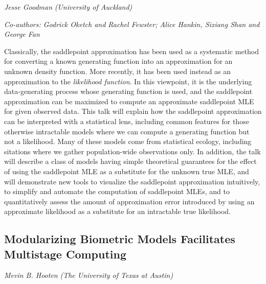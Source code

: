 \documentclass[
]{scrreprt}
\begin{document}
\emph{Jesse Goodman} \emph{(University of
Auckland)}

\emph{Co-authors: Godrick Oketch and Rachel Fewster; Alice Hankin,
Sixiang Shan and George Fan}

\setlength{\parskip}{0.5em}

Classically, the saddlepoint approximation has been used as a systematic
method for converting a known generating function into an approximation
for an unknown density function. More recently, it has been used instead
as an approximation to the \emph{likelihood function}. In this
viewpoint, it is the underlying data-generating process whose generating
function is used, and the saddlepoint approximation can be maximized to
compute an approximate saddlepoint MLE for given observed data. This
talk will explain how the saddlepoint approximation can be interpreted
with a statistical lens, including common features for those otherwise
intractable models where we can compute a generating function but not a
likelihood. Many of these models come from statistical ecology,
including sitations where we gather population-wide observations only.
In addition, the talk will describe a class of models having simple
theoretical guarantees for the effect of using the saddlepoint MLE as a
substitute for the unknown true MLE, and will demonstrate new tools to
visualize the saddlepoint approximation intuitively, to simplify and
automate the computation of saddlepoint MLEs, and to quantitatively
assess the amount of approximation error introduced by using an
approximate likelihood as a substitute for an intractable true
likelihood.

\subsection{Modularizing Biometric Models Facilitates Multistage
Computing}\label{modularizing-biometric-models-facilitates-multistage-computing}

\emph{Mevin B. Hooten} \emph{(The University of
Texas at Austin)}

\setlength{\parskip}{0.5em}
\end{document}
